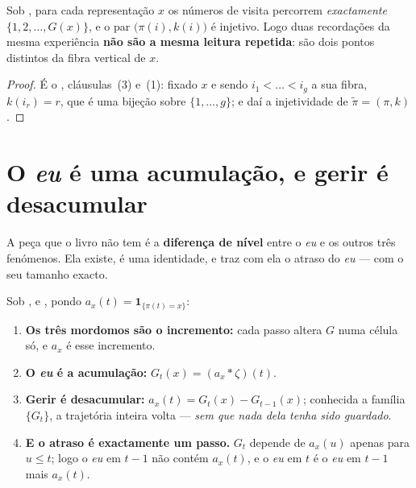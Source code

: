\documentclass[../livro.tex]{subfiles}
\begin{document}
\begin{corolario}\label{mf:cor:folhas}
Sob , para cada representação $x$ os números de visita percorrem
\emph{exactamente} $\{1,2,\dots,G(x)\}$, e o par $\bigl(\pi(i),k(i)\bigr)$ é
injetivo. Logo duas recordações da mesma experiência \textbf{não são a mesma
leitura repetida}: são dois pontos distintos da fibra vertical de $x$.
\end{corolario}

\begin{proof}
É o , cláusulas~(3) e~(1):
fixado $x$ e sendo $i_1<\dots<i_g$ a sua fibra, $k(i_r)=r$, que é uma bijeção
sobre $\{1,\dots,g\}$; e daí a injetividade de $\tilde\pi=(\pi,k)$.
\end{proof}


\section{O \emph{eu} é uma acumulação, e gerir é desacumular}\label{mf:eu}

\noindent A peça que o livro não tem é a \textbf{diferença de nível} entre o
\emph{eu} e os outros três fenómenos. Ela existe, é uma identidade, e traz com
ela o atraso do \emph{eu} --- com o seu tamanho exacto.

\begin{teorema}\label{mf:thm:zetamu}
Sob ,  e , pondo
$a_x(t)=\mathbf{1}_{\{\pi(t)=x\}}$:
\begin{enumerate}\itemsep3pt
\item[(1)] \textbf{Os três mordomos são o incremento:} cada passo altera $G$
numa célula só, e $a_x$ é esse incremento.
\item[(2)] \textbf{O \emph{eu} é a acumulação:} $G_t(x)=(a_x*\zeta)(t)$.
\item[(3)] \textbf{Gerir é desacumular:} $a_x(t)=G_t(x)-G_{t-1}(x)$; conhecida a
família $\{G_t\}$, a trajetória inteira volta --- \emph{sem que nada dela tenha
sido guardado}.
\item[(4)] \textbf{E o atraso é exactamente um passo.} $G_t$ depende de $a_x(u)$
apenas para $u\le t$; logo o \emph{eu} em $t-1$ não contém $a_x(t)$, e o
\emph{eu} em $t$ é o \emph{eu} em $t-1$ mais $a_x(t)$.
\end{enumerate}
\end{teorema}
\end{document}
